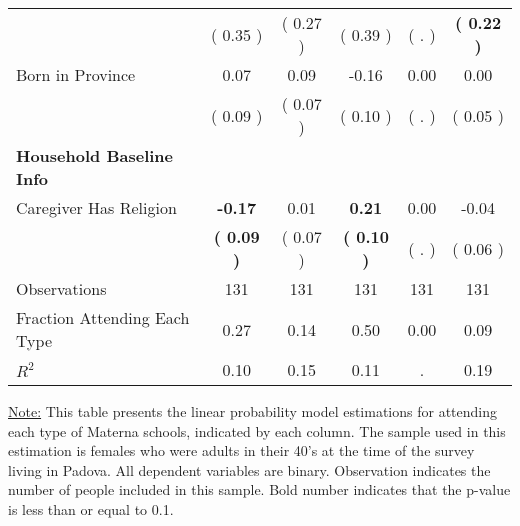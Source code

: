 \begin{table}[H]
{\begin{tabular}{lccccc}
\quad  & (     0.35 ) & (     0.27 )  & (     0.39 )  & (        . ) & \textbf{(     0.22 )} \\
\quad Born in Province &      0.07 &      0.09 &     -0.16 &      0.00 &      0.00 \\
\quad  & (     0.09 ) & (     0.07 )  & (     0.10 )  & (        . ) & (     0.05 ) \\
\midrule
\textbf{Household Baseline Info} \\
\quad Caregiver Has Religion & \textbf{    -0.17} &      0.01 & \textbf{     0.21} &      0.00 &     -0.04 \\
\quad  & \textbf{(     0.09 )} & (     0.07 )  & \textbf{(     0.10 )}  & (        . ) & (     0.06 ) \\
\midrule
Observations & 131 & 131 & 131 & 131 & 131 \\
Fraction Attending Each Type &      0.27 &      0.14 &      0.50 &      0.00 &      0.09 \\
\midrule
$ R^2$ &      0.10 &      0.15 &      0.11 &         . &      0.19 \\
\bottomrule
\end{tabular}}
\end{table}
\begin{footnotesize}
\noindent\underline{Note:} This table presents the linear probability model estimations for attending each type of Materna schools, indicated by each column. The sample used in this estimation is females who were adults in their 40's at the time of the survey living in Padova. All dependent variables are binary. Observation indicates the number of people included in this sample. Bold number indicates that the p-value is less than or equal to 0.1.
\end{footnotesize}
